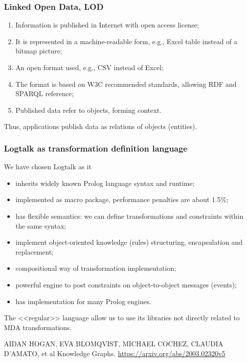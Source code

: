 \documentclass[10pt]{beamer}
\begin{document}
\begin{frame}
  \frametitle{Linked Open Data, LOD}
  \begin{enumerate}
  \item Information is published in Internet with open access license;
  \item It is represented in a machine-readable form, e.g., Excel table instead of a bitmap picture;
  \item An open format used, e.g., CSV instead of Excel;
  \item The format is based on W3C recommended standards, allowing RDF and SPARQL reference;
  \item Published data refer to objects, forming context.
  \end{enumerate}
  Thus, applications publish data as relations of objects (entities).
\end{frame}

\begin{frame}
  \frametitle{Logtalk as transformation definition language}
  We have chosen Logtalk as it
  \begin{itemize}
  \item inherits widely known Prolog language syntax and runtime;
  \item implemented as macro package, performance penalties are about 1.5\%;
  \item has flexible semantics: we can define transformations and constraints within the same syntax;
  \item implement object-oriented knowledge (rules) structuring, encapsulation and replacement;
  \item compositional way of transformation implementation;
  \item powerful engine to post constraints on object-to-object messages (events);
  \item has implementation for many Prolog engines.
  \end{itemize}
  The <<regular>> language allow us to use its libraries not directly related to MDA transformations.
\end{frame}


\begin{thebibliography}{99}

  AIDAN HOGAN, EVA BLOMQVIST, MICHAEL COCHEZ, CLAUDIA D’AMATO, et al Knowledge Graphs.
  \url{https://arxiv.org/abs/2003.02320v5}
\end{thebibliography}
\end{document}
